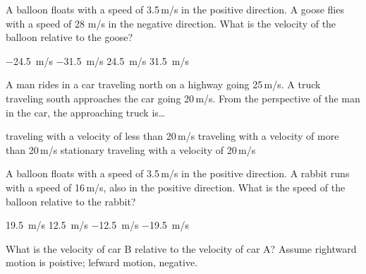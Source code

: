 \documentclass[../main-physics-problems.tex]{subfiles}
\begin{document}
\begin{questions}
\question
A balloon floats with a speed of 3.5\,m/s in the positive direction.  A goose flies with a speed of 28 m/s in the negative direction. What is the velocity of the balloon relative to the goose?

\begin{randomizechoices}
    \choice \SI{-24.5}{m/s}
    \choice \SI{-31.5}{m/s}
    \choice \SI{24.5}{m/s}
    \correctchoice \SI{31.5}{m/s}
\end{randomizechoices}

\question
A man rides in a car traveling north on a highway going 25\,m/s. A truck traveling south approaches the car going 20\,m/s. From the perspective of the man in the car, the approaching truck is\dots

\begin{randomizechoices}
    \choice traveling with a velocity of less than 20\,m/s
    \choice traveling with a velocity of more than 20\,m/s
    \choice stationary
    \choice traveling with a velocity of 20\,m/s
\end{randomizechoices}

\question
A balloon floats with a speed of 3.5\,m/s in the positive direction. A rabbit runs with a speed of 16\,m/s, also in the positive direction. What is the speed of the balloon relative to the rabbit?

\begin{randomizechoices}
    \choice \SI{19.5}{m/s}
    \choice \SI{12.5}{m/s}
    \correctchoice \SI{-12.5}{m/s}
    \choice \SI{-19.5}{m/s}
\end{randomizechoices}

\question
What is the velocity of car B relative to the velocity of car A? Assume rightward motion is poistive; lefward motion, negative.

\begin{center}
\end{center}


\end{questions}
\end{document}
